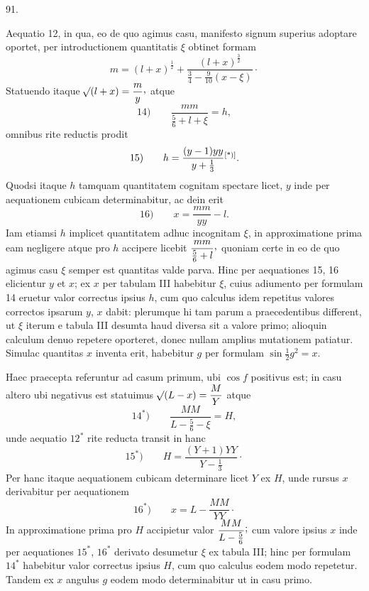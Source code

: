 \par{}\medskip
\hypertarget{native-124-article091}{}
\begin{center}91.\end{center}
Aequatio 12, in qua, eo de quo agimus casu, manifesto signum superius adoptare oportet, per introductionem quantitatis $\xi$ obtinet formam
\[
m=(l+x)^{\frac12}+\dfrac{(l+x)^{\frac32}}{\frac34-\frac{9}{10}(x-\xi)}\mathpunct{\cdot}
\]
Statuendo itaque $\BareRoot{(l+x)}=\dfrac{m}{y}\mathpunct{\raisebox{.45ex}{,}}$ atque
\[
\mathrm{14)}\qquad \dfrac{mm}{\frac56+l+\xi}=h,
\]
omnibus rite reductis prodit
\[
\mathrm{15)}\qquad h=\dfrac{(y-1)yy}{y+\frac13}\mbox{\HistoricalDisplayNoteMark}.
\]
\noindent\HistoricalDisplayNoteText{Handschriftliche Bemerkung:]
\[
y-1=\dfrac{l+x}{\frac34-\frac{9}{10}(x-\xi)}
\]
\[
y=1+\frac{10}{9}h-\frac{110}{81}hh+\frac{2410}{729}h^3-\text{etc.}
\]
\[
yy=1+\frac{20}{9}h-\frac{40}{27}hh+\frac{2620}{729}h^3-\text{etc.}
\]
\[
\dfrac{1}{yy}=1-\frac{20}{9}h+\frac{520}{81}hh-\frac{5140}{243}h^3+\text{etc.}
\]
}Quodsi itaque $h$ tamquam quantitatem cognitam spectare licet, $y$ inde per aequationem cubicam determinabitur, ac dein erit
\[
\mathrm{16)}\qquad x=\dfrac{mm}{yy}-l.
\]
Iam etiamsi $h$ implicet quantitatem adhuc incognitam $\xi$, in approximatione prima eam negligere atque pro $h$ accipere licebit $\dfrac{mm}{\frac56+l}\mathpunct{\raisebox{.45ex}{,}}$ quoniam certe in eo de quo agimus casu $\xi$ semper est quantitas valde parva. Hinc per aequationes 15, 16 elicientur $y$ et $x$; ex $x$ per tabulam III habebitur $\xi$, cuius adiumento per formulam 14 eruetur valor correctus ipsius $h$, cum quo calculus idem repetitus valores correctos ipsarum $y$, $x$ dabit: plerumque hi tam parum a praecedentibus different, ut $\xi$ iterum e tabula III desumta haud diversa sit a valore primo; alioquin calculum denuo repetere oporteret, donec nullam amplius mutationem patiatur. Simulac quantitas $x$ inventa erit, habebitur $g$ per formulam $\sin\tfrac12 g^2=x$.

Haec praecepta referuntur ad casum primum, ubi $\cos f$ positivus est; in casu altero ubi negativus est statuimus $\mathord{{}^{}\!\surd}(L-x)=\dfrac{M}{Y}$ atque
\[
\mathrm{14}^{\ast}\mathrm{)}\qquad \dfrac{MM}{L-\frac56-\xi}=H,
\]
unde aequatio $12^{\ast}$ rite reducta transit in hanc
\[
\mathrm{15}^{\ast}\mathrm{)}\qquad H=\dfrac{(Y+1)YY}{Y-\frac13}\mathpunct{\cdot}
\]
Per hanc itaque aequationem cubicam determinare licet $Y$ ex $H$, unde rursus $x$ derivabitur per aequationem
\[
\mathrm{16}^{\ast}\mathrm{)}\qquad x=L-\dfrac{MM}{YY}\mathpunct{\cdot}
\]
In approximatione prima pro $H$ accipietur valor $\dfrac{MM}{L-\frac56}\mathpunct{\raisebox{.45ex}{;}}$ cum valore ipsius $x$ inde per aequationes $15^{\ast}$, $16^{\ast}$ derivato desumetur $\xi$ ex tabula III; hinc per formulam $14^{\ast}$ habebitur valor correctus ipsius $H$, cum quo calculus eodem modo repetetur. Tandem ex $x$ angulus $g$ eodem modo determinabitur ut in casu primo.

